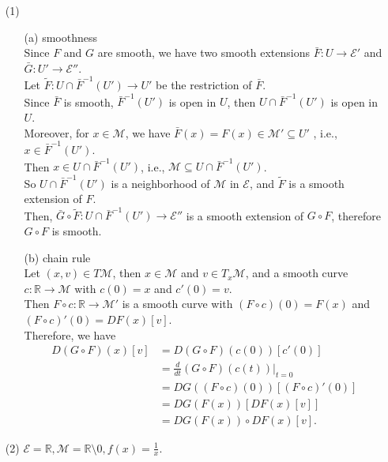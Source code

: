 \documentclass[en, oneside]{assignment}
\begin{document}
\begin{sol}
    \begin{itemize}
        \item[(1)]
        \begin{itemize}
            \item[(a)] smoothness\\
            Since $F$ and $G$ are smooth, we have two smooth extensions $\bar{F}: U \to \mathcal{E}'$ and $\bar{G}: U' \to \mathcal{E}''$.\\
            Let $\tilde{F}: U \cap \bar{F}^{-1}(U') \to U'$ be the restriction of $\bar{F}$.\\
            Since $\bar{F}$ is smooth, $\bar{F}^{-1}(U')$ is open in $U$, then $U \cap \bar{F}^{-1}(U')$ is open in $U$.\\
            Moreover, for $x \in \mathcal{M}$, we have $\bar{F}(x) = F(x) \in \mathcal{M}' \subseteq U'$ , i.e., $x \in \bar{F}^{-1}(U')$.\\
            Then $x \in U \cap \bar{F}^{-1}(U')$, i.e., $\mathcal{M} \subseteq U \cap \bar{F}^{-1}(U')$.\\
            So $U \cap \bar{F}^{-1}(U')$ is a neighborhood of $\mathcal{M}$ in $\mathcal{E}$, and $\tilde{F}$ is a smooth extension of $F$.\\
            Then, $\bar{G} \circ \tilde{F}: U \cap \bar{F}^{-1}(U') \to \mathcal{E}''$ is a smooth extension of $G \circ F$, therefore $G \circ F$ is smooth.
            \item[(b)] chain rule\\
            Let $(x, v) \in T\mathcal{M}$, then $x \in \mathcal{M}$ and $v \in T_x\mathcal{M}$, 
            and a smooth curve $c: \mathbb{R} \to \mathcal{M}$ with $c(0) = x$ and $c'(0) = v$.\\
            Then $F \circ c: \mathbb{R} \to \mathcal{M}'$ is a smooth curve with $(F \circ c)(0) = F(x)$ and $(F \circ c)'(0) = DF(x)[v]$.\\
            Therefore, we have
            \begin{align*}
                D(G \circ F)(x)[v] &= D(G \circ F)(c(0))[c'(0)]\\
                & = \frac{d}{dt} (G \circ F)(c(t))|_{t=0}\\
                & = DG((F \circ c)(0))[(F \circ c)'(0)]\\
                & = DG(F(x))[DF(x)[v]]\\
                & = DG(F(x)) \circ DF(x)[v].
            \end{align*}
        \end{itemize}
        \item[(2)] $\mathcal{E} = \mathbb{R}, \mathcal{M} = \mathbb{R} \setminus  {0}, f(x) = \frac{1}{x}$.
    \end{itemize}
\end{sol}
\end{document}
